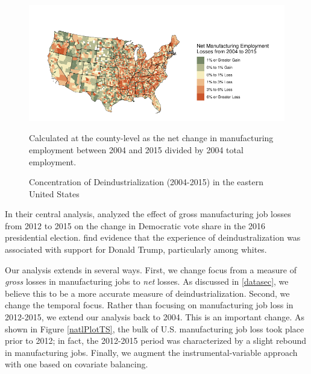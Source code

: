 \documentclass[]{AEA}
\begin{document}
\FloatBarrier
\begin{figure} \label{ManuMap}
\caption{Concentration of Deindustrialization (2004-2015) in the eastern United States }

\begin{center}\includegraphics{Final-Draft_files/figure-latex/unnamed-chunk-2-1} \end{center}



\FloatBarrier
\begin{figurenotes}
Calculated at the county-level as the net change in manufacturing employment between 2004 and 2015 divided by 2004 total employment.
\end{figurenotes}
\end{figure}
\FloatBarrier

In their central analysis, \cite{Baccini21} analyzed the effect of gross
manufacturing job losses from 2012 to 2015 on the change in Democratic
vote share in the 2016 presidential election. \cite{Baccini21} find
evidence that the experience of deindustralization was associated with
support for Donald Trump, particularly among whites.

Our analysis extends \cite{Baccini21} in several ways. First, we change
focus from a measure of \emph{gross} losses in manufacturing jobs to
\emph{net} losses. As discussed in \ref{datasec}, we believe this to be
a more accurate measure of deindustrialization. Second, we change the
temporal focus. Rather than focusing on manufacturing job loss in
2012-2015, we extend our analysis back to 2004. This is an important
change. As shown in Figure \ref{natlPlotTS}, the bulk of U.S.
manufacturing job loss took place prior to 2012; in fact, the 2012-2015
period was characterized by a slight rebound in manufacturing jobs.
Finally, we augment the instrumental-variable approach with one based on
covariate balancing.
\end{document}
